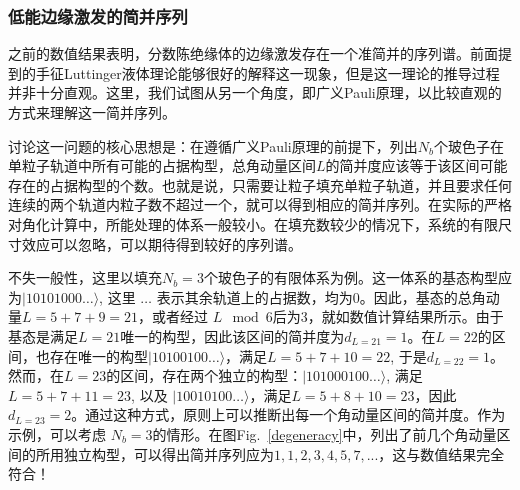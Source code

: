 \subsubsection{低能边缘激发的简并序列}
之前的数值结果表明，分数陈绝缘体的边缘激发存在一个准简并的序列谱。前面提到的手征Luttinger液体理论能够很好的解释这一现象，但是这一理论的推导过程并非十分直观。这里，我们试图从另一个角度，即广义Pauli原理，以比较直观的方式来理解这一简并序列。

讨论这一问题的核心思想是：在遵循广义Pauli原理的前提下，列出$N_b$个玻色子在单粒子轨道中所有可能的占据构型，总角动量区间$L$的简并度应该等于该区间可能存在的占据构型的个数。也就是说，只需要让粒子填充单粒子轨道，并且要求任何连续的两个轨道内粒子数不超过一个，就可以得到相应的简并序列。在实际的严格对角化计算中，所能处理的体系一般较小。在填充数较少的情况下，系统的有限尺寸效应可以忽略，可以期待得到较好的序列谱。

不失一般性，这里以填充$N_b = 3$个玻色子的有限体系为例。这一体系的基态构型应为$|10101000 \ldots \rangle$, 这里 $\ldots$ 表示其余轨道上的占据数，均为0。因此，基态的总角动量$L = 5 + 7 + 9 = 21$，或者经过 $L \mod 6$后为3，就如数值计算结果所示。由于基态是满足$L=21$唯一的构型，因此该区间的简并度为$d_{L=21}=1$。在$L=22$的区间，也存在唯一的构型$|10100100 \ldots \rangle$，满足$L=5+7+10 =
22$, 于是$d_{L=22}=1$。然而，在$L=23$的区间，存在两个独立的构型：$|101000100 \ldots \rangle$, 满足 $L=5+7+11 = 23$, 以及 $|10010100 \ldots \rangle$，满足$L=5+8+10 = 23$，因此$d_{L=23}=2$。通过这种方式，原则上可以推断出每一个角动量区间的简并度。作为示例，可以考虑 $N_b=3$的情形。在图Fig.~\ref{degeneracy}中，列出了前几个角动量区间的所用独立构型，可以得出简并序列应为$1,1,2,3,4,5,7, ...$，这与数值结果完全符合！